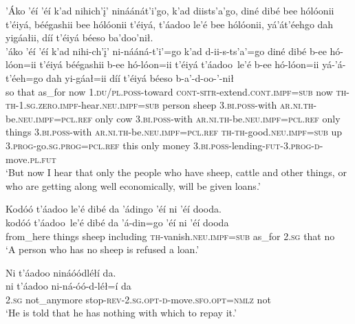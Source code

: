 \ea\label{ex:text7-16-5}
’Áko ’éí ’éí k’ad nihich’į’ nináánát’i’go, k’ad diists’a’go, diné dibé bee hólóonii t’éiyá, béégashii bee hólóonii t’éiyá, t’áadoo le’é bee hólóonii, yá’át’éehgo dah yigáałii, díí t’éiyá béeso ba’doo’nił.\\
\gll ’áko	’éí	’éí	k’ad	nihi-ch’į’	ni-nááná-t’i’=go	k’ad	d-ii-s-ts’a’=go	diné	dibé	b-ee	hó-lóon=ii	t’éiyá	béégashii	b-ee	hó-lóon=ii	t’éiyá	t’áadoo~{le’é}	b-ee	hó-lóon=ii	yá-’á-t’éeh=go	dah	yi-gáał=ii	díí	t’éiyá	béeso	b-a’-d-oo-’-nił\\
     so	that	as\_for	now	1.\textsc{du}/\textsc{pl}.\textsc{poss}-toward	\textsc{cont}-\textsc{sitr}-extend.\textsc{cont}.\textsc{impf}=\textsc{sub}	now	\textsc{th}-\textsc{th}-1.\textsc{sg}.\textsc{zero}.\textsc{impf}-hear.\textsc{neu}.\textsc{impf}=\textsc{sub}	person	sheep	3.\textsc{bi}.\textsc{poss}-with	\textsc{ar}.\textsc{ni}.\textsc{th}-be.\textsc{neu}.\textsc{impf}=\textsc{pcl}.\textsc{ref}	only	cow	3.\textsc{bi}.\textsc{poss}-with	\textsc{ar}.\textsc{ni}.\textsc{th}-be.\textsc{neu}.\textsc{impf}=\textsc{pcl}.\textsc{ref}	only	things	3.\textsc{bi}.\textsc{poss}-with	\textsc{ar}.\textsc{ni}.\textsc{th}-be.\textsc{neu}.\textsc{impf}=\textsc{pcl}.\textsc{ref}	\textsc{th}-\textsc{th}-good.\textsc{neu}.\textsc{impf}=\textsc{sub}	up	3.\textsc{prog}-go.\textsc{sg}.\textsc{prog}=\textsc{pcl}.\textsc{ref}	this	only	money	3.\textsc{bi}.\textsc{poss}-lending-\textsc{fut}-3.\textsc{prog}-\textsc{d}-move.\textsc{pl}.\textsc{fut}\\
\glt `But now I hear that only the people who have sheep, cattle and other things, or who are getting along well economically, will be given loans.'
\z

\ea\label{ex:text7-16-6}
Kodóó t’áadoo le’é dibé da ’ádingo ’éí ni ’éí dooda.\\
\gll kodóó	t’áadoo~{le’é}	dibé	da	’á-din=go	’éí	ni	’éí	dooda\\
     from\_here	things	sheep	including	\textsc{th}-vanish.\textsc{neu}.\textsc{impf}=\textsc{sub}	as\_for	2.\textsc{sg}	that	no\\
\glt `A person who has no sheep is refused a loan.'
\z

\ea\label{ex:text7-16-7}
Ni t’áadoo nináóódléłí da.\\
\gll ni	t’áadoo	ni-ná-óó-d-léł=í	da\\
     2.\textsc{sg}	not\_anymore	stop-\textsc{rev}-2.\textsc{sg}.\textsc{opt}-\textsc{d}-move.\textsc{sfo}.\textsc{opt}=\textsc{nmlz}	not\\
\glt `He is told that he has nothing with which to repay it.'
\z

